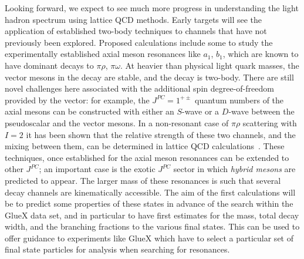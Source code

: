 

Looking forward, we expect to see much more progress in understanding the light hadron spectrum using lattice QCD methods. Early targets will see the application of established two-body techniques to channels that have not previously been explored. Proposed calculations include some to study the experimentally established axial meson resonances like $a_1$, $b_1$, which are known to have dominant decays to $\pi \rho$, $\pi \omega$. At heavier than physical light quark masses, the vector mesons in the decay are stable, and the decay is two-body. There are still novel challenges here associated with the additional spin degree-of-freedom provided by the vector: for example, the $J^{PC}=1^{+\pm}$ quantum numbers of the axial mesons can be constructed with either an $S$-wave or a $D$-wave between the pseudoscalar and the vector mesons. In a non-resonant case of $\pi \rho$ scattering with $I=2$ it has been shown that the relative strength of these two channels, and the mixing between them, can be determined in lattice QCD calculations~\cite{Woss:2018irj}. These techniques, once established for the axial meson resonances can be extended to other $J^{PC}$; an important case is the exotic $J^{PC}$ sector in which \emph{hybrid mesons} are predicted to appear. The larger mass of these resonances is such that several decay channels are kinematically accessible. The aim of the first calculations will be to predict some properties of these states in advance of the search within the GlueX data set, and in particular to have first estimates for the mass, total decay width, and the branching fractions to the various final states. This can be used to offer guidance to experiments like GlueX which have to select a particular set of final state particles for analysis when searching for resonances.

